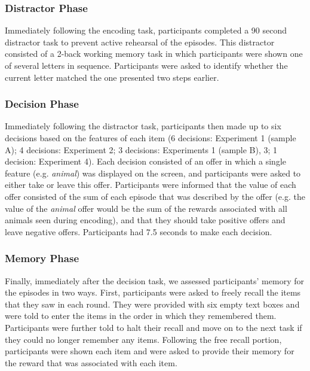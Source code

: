 \documentclass[10pt,letterpaper]{article}
\begin{document}
\subsubsection{Distractor Phase}

Immediately following the encoding task, participants completed a 90 second distractor task to prevent active rehearsal of the episodes. This distractor consisted of a 2-back working memory task in which participants were shown one of several letters in sequence. Participants were asked to identify whether the current letter matched the one presented two steps earlier.

\subsubsection{Decision Phase}

Immediately following the distractor task, participants then made up to six decisions based on the features of each item (6 decisions: Experiment 1 (sample A); 4 decisions: Experiment 2; 3 decisions: Experiments 1 (sample B), 3; 1 decision: Experiment 4). Each decision consisted of an offer in which a single feature (e.g. \textit{animal}) was displayed on the screen, and participants were asked to either take or leave this offer. Participants were informed that the value of each offer consisted of the sum of each episode that was described by the offer (e.g. the value of the \textit{animal} offer would be the sum of the rewards associated with all animals seen during encoding), and that they should take positive offers and leave negative offers. Participants had 7.5 seconds to make each decision.

\subsubsection{Memory Phase}

Finally, immediately after the decision task, we assessed participants' memory for the episodes in two ways. First, participants were asked to freely recall the items that they saw in each round. They were provided with six empty text boxes and were told to enter the items in the order in which they remembered them. Participants were further told to halt their recall and move on to the next task if they could no longer remember any items. Following the free recall portion, participants were shown each item and were asked to provide their memory for the reward that was associated with each item.
\end{document}
